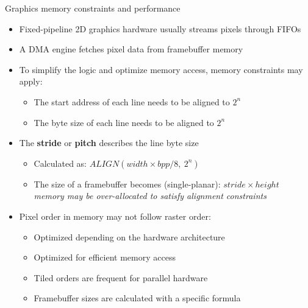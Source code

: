 \begin{frame}{Graphics memory constraints and performance}
  \begin{itemize}
  \item Fixed-pipeline 2D graphics hardware usually streams pixels through FIFOs
  \item A DMA engine fetches pixel data from framebuffer memory
  \item To simplify the logic and optimize memory access, memory constraints may apply:\\
    \begin{itemize}
    \item The start address of each line needs to be aligned to \(2^n\)
    \item The byte size of each line needs to be aligned to \(2^n\)
    \end{itemize}
  \item The \textbf{stride} or \textbf{pitch} describes the line byte size
    \begin{itemize}
    \item Calculated as: \(ALIGN(width \times bpp / 8,~2^n)\)
    \item The size of a framebuffer becomes (single-planar): \(stride \times height\)\\
      \textit{memory may be over-allocated to satisfy alignment constraints}
    \end{itemize}
  \item Pixel order in memory may not follow raster order:
    \begin{itemize}
    \item Optimized depending on the hardware architecture
    \item Optimized for efficient memory access
    \item Tiled orders are frequent for parallel hardware
    \item Framebuffer sizes are calculated with a specific formula
    \end{itemize}
  \end{itemize}
\end{frame}

